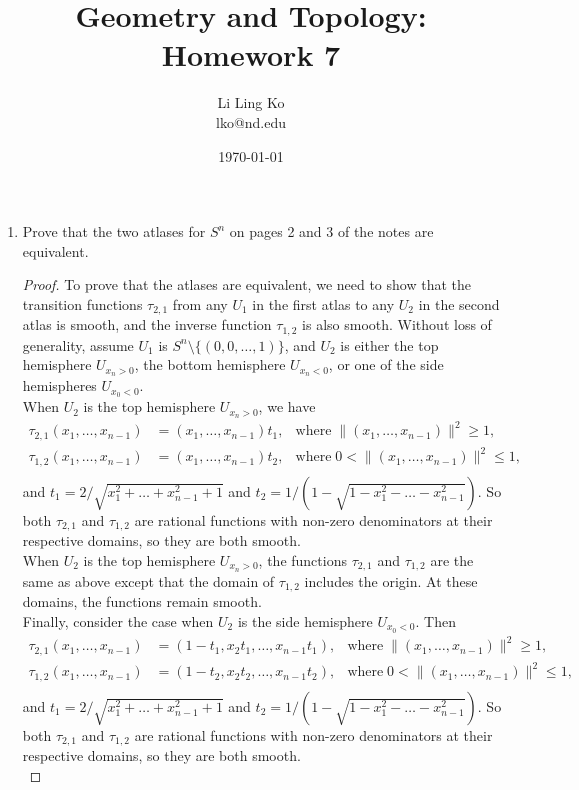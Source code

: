 \documentclass{article}
\begin{document}
\title{Geometry and Topology: Homework 7}
\author{Li Ling Ko\\ lko@nd.edu}
\date{\today}
\maketitle

\begin{enumerate}[label={\bf Q\arabic*:}]
  \item Prove that the two atlases for $S^n$ on pages 2 and 3 of the notes
    are equivalent.

    \begin{proof}
      To prove that the atlases are equivalent, we need to show that the
      transition functions $\tau_{2,1}$ from any $U_1$ in the first atlas
      to any $U_2$ in the second atlas is smooth, and the inverse function
      $\tau_{1,2}$ is also smooth. Without loss of generality, assume $U_1$
      is $S^n\setminus\{(0,0,\ldots,1)\}$, and $U_2$ is either the top
      hemisphere $U_{x_n>0}$, the bottom hemisphere $U_{x_n<0}$, or one of
      the side hemispheres $U_{x_0<0}$. \\

      When $U_2$ is the top hemisphere $U_{x_n>0}$, we have
      \begin{align*}
        \tau_{2,1}(x_1,\ldots,x_{n-1}) &= (x_1,\ldots,x_{n-1})t_1, &
        \text{where}\; \|(x_1,\ldots,x_{n-1})\|^2\geq1, \\
        \tau_{1,2}(x_1,\ldots,x_{n-1}) &= (x_1,\ldots,x_{n-1})t_2, &
        \text{where}\; 0<\|(x_1,\ldots,x_{n-1})\|^2\leq1, \\
      \end{align*}
      and $t_1=2/\sqrt{x_1^2+\ldots+x_{n-1}^2+1}$ and
      $t_2=1/(1-\sqrt{1-x_1^2-\ldots-x_{n-1}^2})$. So both $\tau_{2,1}$ and
      $\tau_{1,2}$ are rational functions with non-zero denominators at
      their respective domains, so they are both smooth. \\

      When $U_2$ is the top hemisphere $U_{x_n>0}$, the functions
      $\tau_{2,1}$ and $\tau_{1,2}$ are the same as above
      except that the domain of $\tau_{1,2}$ includes the origin. At these
      domains, the functions remain smooth. \\

      Finally, consider the case when $U_2$ is the side hemisphere
      $U_{x_0<0}$. Then
      \begin{align*}
        \tau_{2,1}(x_1,\ldots,x_{n-1}) &= (1-t_1,x_2t_1,\ldots,x_{n-1}t_1), &
        \text{where}\; \|(x_1,\ldots,x_{n-1})\|^2\geq1, \\
        \tau_{1,2}(x_1,\ldots,x_{n-1}) &= (1-t_2,x_2t_2,\ldots,x_{n-1}t_2), &
        \text{where}\; 0<\|(x_1,\ldots,x_{n-1})\|^2\leq1, \\
      \end{align*}
      and $t_1=2/\sqrt{x_1^2+\ldots+x_{n-1}^2+1}$ and
      $t_2=1/(1-\sqrt{1-x_1^2-\ldots-x_{n-1}^2})$. So both $\tau_{2,1}$ and
      $\tau_{1,2}$ are rational functions with non-zero denominators at
      their respective domains, so they are both smooth. \\
    \end{proof}


\end{enumerate}
\end{document}
